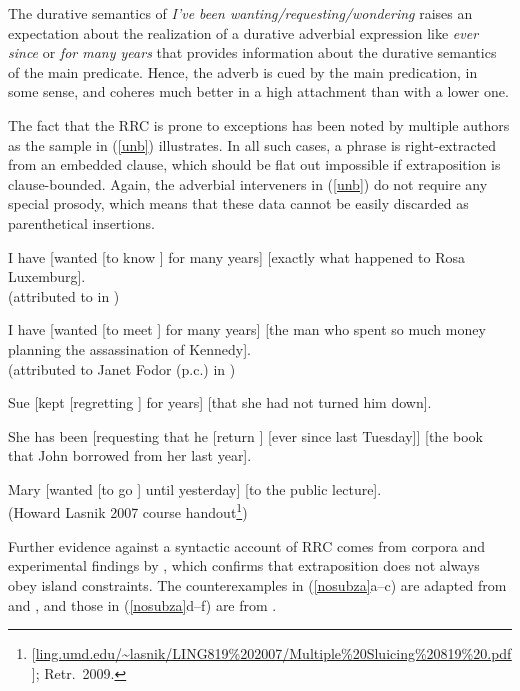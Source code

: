 \documentclass[output=paper]{langsci/langscibook}
\begin{document}
\noindent
The  durative semantics  of   \emph{I've been wanting/requesting/wondering} 
 raises an expectation about the realization of   a durative  
adverbial expression like  \emph{ever since} or \emph{for many years} that
provides information about the durative semantics of the main predicate.
Hence, the adverb is cued by the main predication, in some sense, and 
  coheres much better in a high attachment than with a lower one.

The fact that the RRC is prone to exceptions has been noted by multiple authors as the sample in 
 (\ref{unb}) illustrates. In all such cases, a phrase is right-extracted
 from an embedded clause, which should be flat out impossible if extraposition is clause-bounded. Again, the adverbial  interveners in (\ref{unb}) do not require any special prosody, which means that
  these data cannot be easily discarded as parenthetical insertions.
  
\ea \label{unb}
\ea  I have  [wanted [to know \spc] for many years] [exactly what happened to Rosa Luxemburg].\\
(attributed to \citet{
witten} in \citet[92n]{postal74})

\item I have  [wanted [to meet \spc] for many years] [the man who spent so much money planning the assassination of Kennedy].\\
(attributed to Janet Fodor (p.c.) in \citet[177]{gazdar})

\item Sue [kept [regretting \spc] for years] [that she had not turned
him down].\\
\citep{eynde96}

\item She has been [requesting that he [return \spc] [ever since last Tuesday]] [the book
that John borrowed from her last year].\\
\citep[251]{kayne00}

\item  Mary [wanted [to go \spc] until yesterday]  [to the public lecture].\\
(Howard Lasnik 2007 course handout\footnote{[\url{ling.umd.edu/~lasnik/LING819\%202007/Multiple\%20Sluicing\%20819\%20.pdf}]; Retr.\ 2009.})
\z
\z


Further evidence against a syntactic account of RRC comes from  corpora and experimental findings by  \citet{strunk08,strunk}, which confirms that  extraposition does  not always obey  island constraints.  The counterexamples in (\ref{nosubza}a--c) are adapted from
 \citet{strunk08} and \citet{strunk}, and those in (\ref{nosubza}d--f) are from \citet[863]{chavesrnr}.
\end{document}
